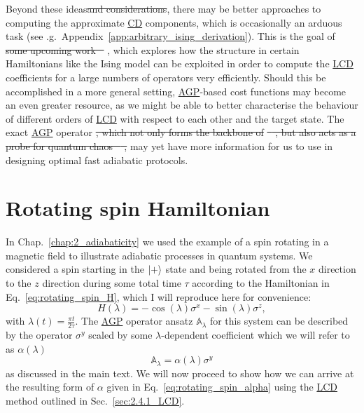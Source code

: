 \documentclass[a4paper,oneside,11pt]{book}
\newcommand{\sx}{\sigma^x}
\newcommand{\sy}{\sigma^y}
\newcommand{\sz}{\sigma^z}
\newcommand{\approxAGP}{\mathbb{A}_{\lambda}}
\newcommand{\acrref}[1]{\hyperref[acr:#1]{#1}}
\providecommand{\DIFaddtex}[1]{{\protect\color{blue}\uwave{#1}}} %
\providecommand{\DIFdeltex}[1]{{\protect\color{red}\sout{#1}}}                      %
\providecommand{\DIFaddbegin}{} %
\providecommand{\DIFaddend}{} %
\providecommand{\DIFdelbegin}{} %
\providecommand{\DIFdelend}{} %
\providecommand{\DIFadd}[1]{\texorpdfstring{\DIFaddtex{#1}}{#1}} %
\providecommand{\DIFdel}[1]{\texorpdfstring{\DIFdeltex{#1}}{}} %
\newcommand{\DIFscaledelfig}{0.5}
\newlength{\DIFdelgraphicswidth} %
\newlength{\DIFdelgraphicsheight} %
\newcommand{\DIFaddincludegraphics}[2][]{{\color{blue}\fbox{\DIFOincludegraphics[#1]{#2}}}} %
\newcommand{\DIFdelincludegraphics}[2][]{%
\sbox{\DIFdelgraphicsbox}{\DIFOincludegraphics[#1]{#2}}%
\settoboxwidth{\DIFdelgraphicswidth}{\DIFdelgraphicsbox} %
\settoboxtotalheight{\DIFdelgraphicsheight}{\DIFdelgraphicsbox} %
\scalebox{\DIFscaledelfig}{%
\parbox[b]{\DIFdelgraphicswidth}{\usebox{\DIFdelgraphicsbox}\\[-\baselineskip] \rule{\DIFdelgraphicswidth}{0em}}\llap{\resizebox{\DIFdelgraphicswidth}{\DIFdelgraphicsheight}{%
\setlength{\unitlength}{\DIFdelgraphicswidth}%
\begin{picture}(1,1)%
\thicklines\linethickness{2pt} %
{\color[rgb]{1,0,0}\put(0,0){\framebox(1,1){}}}%
{\color[rgb]{1,0,0}\put(0,0){\line( 1,1){1}}}%
{\color[rgb]{1,0,0}\put(0,1){\line(1,-1){1}}}%
\end{picture}%
}\hspace*{3pt}}} %
} %
\DeclareRobustCommand{\DIFaddbegin}{\DIFOaddbegin \let\includegraphics\DIFaddincludegraphics} %
\DeclareRobustCommand{\DIFaddend}{\DIFOaddend \let\includegraphics\DIFOincludegraphics} %
\DeclareRobustCommand{\DIFdelbegin}{\DIFOdelbegin \let\includegraphics\DIFdelincludegraphics} %
\DeclareRobustCommand{\DIFdelend}{\DIFOaddend \let\includegraphics\DIFOincludegraphics} %
\begin{document}
Beyond these ideas\DIFdelbegin \DIFdel{and considerations}\DIFdelend , there may be better approaches to computing the approximate \acrref{CD} components, which is occasionally an arduous task (see \@e.g.~Appendix~\ref{app:arbitrary_ising_derivation}). This is the goal of \DIFdelbegin \DIFdel{some upcoming work \mbox{%
\cite{lawrence_numerical_2023}}\hskip0pt%
}\DIFdelend \DIFaddbegin \DIFadd{\mbox{%
\cite{lawrence_numerical_2024}}\hskip0pt%
}\DIFaddend , which explores how the structure in certain Hamiltonians like the Ising model can be exploited in order to compute the \acrref{LCD} coefficients for a large numbers of operators very efficiently. Should this be accomplished in a more general setting, \acrref{AGP}-based cost functions may become an even greater resource, as we might be able to better characterise the behaviour of different orders of \acrref{LCD} with respect to each other and the target state. The exact \acrref{AGP} operator \DIFdelbegin \DIFdel{, which not only forms the backbone of }%
\DIFdel{\mbox{%
\cite{kolodrubetz_geometry_2017, sels_minimizing_2017}}\hskip0pt%
, but also acts as a probe for quantum chaos \mbox{%
\cite{pandey_adiabatic_2020, bhattacharjee_lanczos_2023}}\hskip0pt%
, }\DIFdelend may yet have more information for us to use in designing optimal fast adiabatic protocols.

\appendix

\chapter{Rotating spin Hamiltonian}\label{app:rotating_spin_hamiltonian}

In Chap.~\ref{chap:2_adiabaticity} we used the example of a spin rotating in a magnetic field to illustrate adiabatic processes in quantum systems. We considered a spin starting in the $\ket{+}$ state and being rotated from the $x$ direction to the $z$ direction during some total time $\tau$ according to the Hamiltonian in Eq.~\eqref{eq:rotating_spin_H}, which I will reproduce here for convenience:
\begin{equation}\label{eq:rotating_spin_H_lambda_2}
    H(\lambda) = -\cos(\lambda)\sx - \sin(\lambda)\sz,
\end{equation}
with $\lambda(t) = \frac{\pi t}{2 \tau}$. The \acrref{AGP} operator ansatz $\approxAGP$ for this system can be described by the operator $\sy$ scaled by some $\lambda$-dependent coefficient which we will refer to as $\alpha(\lambda)$
\begin{equation}
    \approxAGP = \alpha(\lambda) \sy
\end{equation}
as discussed in the main text. We will now proceed to show how we can arrive at the resulting form of $\alpha$ given in Eq.~\eqref{eq:rotating_spin_alpha} using the \acrref{LCD} method outlined in Sec.~\ref{sec:2.4.1_LCD}.
\end{document}
